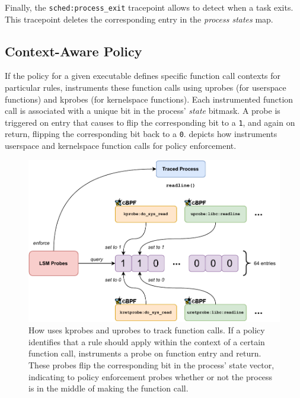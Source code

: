 Finally, the \texttt{sched:process\_exit} tracepoint allows \bpfbox{} to detect when
a task exits. This tracepoint deletes the corresponding entry in the \textit{process
states} map.

\subsection{Context-Aware Policy}
\label{ss:bpfbox-context-aware}

If the policy for a given executable defines specific function call contexts for
particular rules, \bpfbox{} instruments these function calls using uprobes (for userspace
functions) and kprobes (for kernelspace functions). Each instrumented function call is
associated with a unique bit in the process' \textit{state} bitmask.  A probe is triggered
on entry that causes \bpfbox{} to flip the corresponding bit to a \texttt{1}, and again on
return, flipping the corresponding bit back to a \texttt{0}.
 depicts how \bpfbox{} instruments userspace and
kernelspace function calls for policy enforcement.

\begin{figure}[p]
  \centering
  \includegraphics[width=1\linewidth]{figs/bpfbox/function-calls.pdf}
  \caption[How \bpfbox{} tracks function calls]{
    How \bpfbox{} uses kprobes and uprobes to track function calls.  If a policy
    identifies that a rule should apply within the context of a certain function call,
    \bpfbox{} instruments a probe on function entry and return. These probes flip the
    corresponding bit in the process' state vector, indicating to policy enforcement
    probes whether or not the process is in the middle of making the function call.
  }%
  \label{fig:bpfbox-function-calls}
\end{figure}

